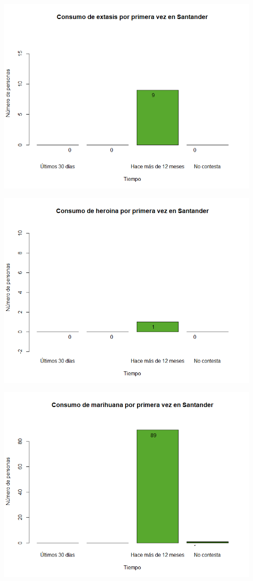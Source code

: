 \documentclass[
]{article}
\begin{document}
\includegraphics{images/extasis 1 santander.png}

\includegraphics{images/heroina 1 santander.png}

\includegraphics{images/marihuana 1 santander.png}
\end{document}
